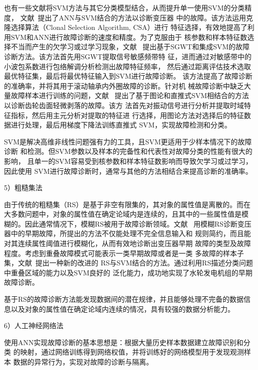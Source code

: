 也有一些文献将SVM方法与其它分类模型结合，从而提升单一使用SVM的分类精度，
文献~提出了ANN与SVM结合的方法以诊断变压器
中的故障。该方法运用克隆选择算法（Clonal Selection Algorithm, CSA）进行
特征选择，有效地提高了利用SVM和ANN进行故障诊断的速度和精度。为了克服由于
核参数和样本特征数选择不当而产生的欠学习或过学习现象，文献~
提出基于SGWT和集成SVM的故障诊断方法。该方法首先用SGWT提取信号敏感频带特
征，进而通过对敏感带中的小波包系数进行包络解调分析检测出故障特征频率，
然后通过距离评估技术选取最优特征集，最后将最优特征输入到SVM进行故障诊断。
该方法提高了故障诊断的准确率，并将其用于滚动轴承内外圈故障的诊断。针对机
械故障诊断中缺乏大量故障样本进行训练的问题，文献~
提出了基于图论和直推式SVM相结合的方法以诊断齿轮齿面轻微剥落的故障。该方
法首先对振动信号进行分析并提取时域特征指标，然后用主元分析对提取的特征进
行选择，用图论方法对选择后的特征数据进行处理，最后用梯度下降法训练直推式
SVM，实现故障检测和分类。

SVM是解决高维非线性问题强有力的工具，且SVM更适用于少样本情况下的故障诊断
和检测。但SVM参数以及样本的完备性和代表性对故障分类的性能有很大的影响，
且单一的SVM容易受到核参数和样本特征数影响而导致欠学习或过学习，因此使用
SVM进行故障诊断时，通常与其他的方法相结合来提高诊断的准确率。

5）粗糙集法

由于传统的粗糙集（RS）是基于非空有限集的，其对象的属性值是离散的。而在
大多数问题中，对象的属性值在确定论域内是连续的，且其中的一些属性值是模
糊的。因此通常情况下，模糊RS被用于故障诊断领域。文献~
用模糊RS诊断变压器中的早期故障，所提出的方法不仅能处理不完全信息输入和
规则简约，而且能对其连续属性阈值进行模糊化，从而有效地诊断出变压器早期
故障的类型及故障程度。考虑到重叠故障模式可能表示一类早期故障或者是一类
多故障的样本子集，文献~提出一种新的改进的
RS与SVM结合的方法。通过利用RS描述分类问题中重叠区域的能力以及SVM良好的
泛化能力，成功地实现了水轮发电机组的早期故障诊断。

基于RS的故障诊断方法能发现数据间的潜在规律，并且能够处理不完备的数据信
息以及对象的属性值在确定论域内连续的情况，具有较强的数据分析能力。

6）人工神经网络法

使用ANN实现故障诊断的基本思想是：根据大量历史样本数据建立故障识别和分类
的映射，通过网络训练得到网络权值，并将训练好的网络模型用于发现观测样本
数据的异常行为，实现对故障的诊断与隔离。

